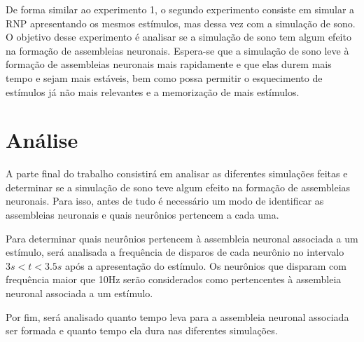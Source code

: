 De forma similar ao experimento 1, o segundo experimento consiste em simular a RNP apresentando os mesmos estímulos, mas dessa vez
com a simulação de sono. O objetivo desse experimento é analisar se a simulação de sono tem algum efeito na formação de
assembleias neuronais. Espera-se que a simulação de sono leve à formação de assembleias neuronais mais rapidamente e que elas
durem mais tempo e sejam mais estáveis, bem como possa permitir o esquecimento de estímulos já não mais relevantes e a memorização
de mais estímulos.

\section{Análise}

A parte final do trabalho consistirá em analisar as diferentes simulações feitas e determinar se a simulação de sono teve algum
efeito na formação de assembleias neuronais. Para isso, antes de tudo é necessário um modo de identificar as assembleias neuronais
e quais neurônios pertencem a cada uma.

Para determinar quais neurônios pertencem à assembleia neuronal associada a um estímulo, será analisada a frequência de disparos de
cada neurônio no intervalo $3s < t < 3.5s$ após a apresentação do estímulo. Os neurônios que disparam com frequência maior que
10Hz serão considerados como pertencentes à assembleia neuronal associada a um estímulo.

Por fim, será analisado quanto tempo leva para a assembleia neuronal associada ser formada e quanto tempo ela dura nas diferentes
simulações.


